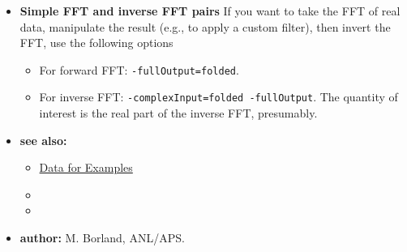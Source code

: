 \begin{itemize}
\begin{itemize}
\begin{table}[hbt]
        \label{table3}
        \end{table}
     \end{itemize}
\item {\bf Simple FFT and inverse FFT pairs} If you want to take the FFT of real data, manipulate the result (e.g.,
  to apply a custom filter), then invert the FFT, use the following options
  \begin{itemize}
  \item For forward FFT: \verb|-fullOutput=folded|.
  \item For inverse FFT: \verb|-complexInput=folded -fullOutput|. The quantity of interest is the real part of the inverse
    FFT, presumably.
  \end{itemize}
\item {\bf see also:}
    \begin{itemize}
    \item \hyperref[exampleData]{Data for Examples}
    \item {}
    \item {}
    \end{itemize}
\item {\bf author:} M. Borland, ANL/APS.
\end{itemize}

